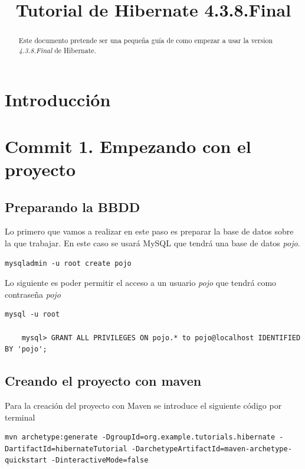 \documentclass{article}
\title{\textbf{Tutorial de Hibernate 4.3.8.Final}}
\date{} %
\begin{document}
\maketitle %

\renewcommand{\abstractname}{Abstract} %
\begin{abstract}
	Este documento pretende ser una pequeña guía de como empezar a usar la version \emph{4.3.8.Final} de Hibernate.
\end{abstract}

\renewcommand{\contentsname}{} %
{\setlength{\parskip}{0mm} \tableofcontents} %

\newpage

\section{Introducción}


\section{Commit 1. Empezando con el proyecto}

\subsection{Preparando la BBDD}
	Lo primero que vamos a realizar en este paso es preparar la base de datos sobre la que trabajar. En este caso se usará MySQL que tendrá una base de datos \emph{pojo}.
\begin{lstlisting}[style=bash]
	mysqladmin -u root create pojo
\end{lstlisting}

	Lo siguiente es poder permitir el acceso a un usuario \emph{pojo} que tendrá como contraseña \emph{pojo}
\begin{lstlisting}[style=bash]
	mysql -u root
	
	mysql> GRANT ALL PRIVILEGES ON pojo.* to pojo@localhost IDENTIFIED BY 'pojo';
\end{lstlisting}

\subsection{Creando el proyecto con maven}
	Para la creación del proyecto con Maven se introduce el siguiente código por terminal
\begin{lstlisting}[style=bash]
mvn archetype:generate -DgroupId=org.example.tutorials.hibernate -DartifactId=hibernateTutorial -DarchetypeArtifactId=maven-archetype-quickstart -DinteractiveMode=false
\end{lstlisting}
\end{document}
